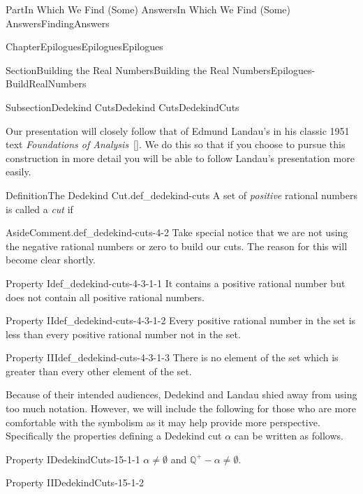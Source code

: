 \documentclass[oneside,10pt,]{book}
\newcommand{\xreffont}{\relax}
\numberwithin{equation}{part}
\newcommand{\QQ}{\mathbb {Q}}
\begin{document}
\begin{partptx}{Part}{In Which We Find (Some) Answers}{}{In Which We Find (Some) Answers}{}{}{FindingAnswers}
\begin{chapterptx}{Chapter}{Epilogues}{}{Epilogues}{}{}{Epilogues}
\begin{sectionptx}{Section}{Building the Real Numbers}{}{Building the Real Numbers}{}{}{Epilogues-BuildRealNumbers}
\begin{subsectionptx}{Subsection}{Dedekind Cuts}{}{Dedekind Cuts}{}{}{DedekindCuts}
\par
Our presentation will closely follow that of Edmund Landau's in his classic 1951 text \emph{Foundations of Analysis}~\hyperlink{landau66__found_analy}{[{\xreffont 7}]}. We do this so that if you choose to pursue this construction in more detail you will be able to follow Landau's presentation more easily.%
\begin{definition}{Definition}{The Dedekind Cut.}{def_dedekind-cuts}%
%
%
A set of \emph{positive} rational numbers is called a \emph{cut} if%
\begin{aside}{Aside}{Comment.}{def_dedekind-cuts-4-2}%
Take special notice that we are not using the negative rational numbers or zero to build our cuts.  The reason for this will become clear shortly.%
\end{aside}
%
\begin{descriptionlist}
\begin{dlimedium}{Property I}{def_dedekind-cuts-4-3-1-1}%
It contains a positive rational number but does not contain all positive rational numbers.%
\end{dlimedium}%
\begin{dlimedium}{Property II}{def_dedekind-cuts-4-3-1-2}%
Every positive rational number in the set is less than every positive rational number not in the set.%
\end{dlimedium}%
\begin{dlimedium}{Property III}{def_dedekind-cuts-4-3-1-3}%
There is no element of the set which is greater than every other element of the set.%
\end{dlimedium}%
\end{descriptionlist}
%
\end{definition}
 Because of their intended audiences, Dedekind and Landau shied away from using too much notation.  However, we will include the following for those who are more comfortable with the symbolism as it may help provide more perspective. Specifically the properties defining a Dedekind cut \(\alpha\) can be written as follows.%
\par
%
\begin{descriptionlist}
\begin{dlimedium}{Property I}{DedekindCuts-15-1-1}%
\(\alpha\ne\emptyset\) and \(\QQ^+-\alpha\ne\emptyset\).%
\end{dlimedium}%
\begin{dlimedium}{Property II}{DedekindCuts-15-1-2}%

\end{dlimedium}
\end{descriptionlist}
\end{subsectionptx}
\end{sectionptx}
\end{chapterptx}
\end{partptx}
\end{document}

